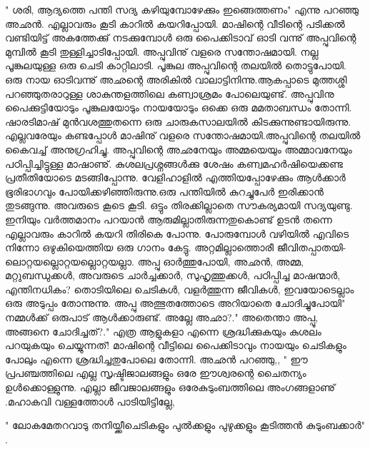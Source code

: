 " ശരി, ആദ്യത്തെ പന്തി സദ്യ കഴിയുമ്പോഴേക്കും ഇങ്ങെത്തണം" എന്നു പറഞ്ഞു അഛൻ. എല്ലാവരും കൂടി കാറിൽ കയറിപ്പോയി.
    മാഷിന്റെ വീടിന്റെ പടിക്കൽ വണ്ടിയിട്ട് അകത്തേക്കു് നടക്കുമ്പോൾ ഒരു പൈക്കിടാവ് ഓടി വന്നു് അപ്പുവിന്റെ മുമ്പിൽ  കൂടി തുള്ളിച്ചാടിപ്പോയി. അപ്പുവിനു് വളരെ സന്തോഷമായി. നല്ല പൂങ്കുലയുള്ള ഒരു ചെടി കാറ്റിലാടി. പൂങ്കുല അപ്പുവിന്റെ തലയിൽ തൊട്ടുപോയി. ഒരു നായ ഓടിവന്നു് അഛന്റെ അരികിൽ വാലാട്ടിനിന്നു.ആകപ്പാടെ മുത്തശ്ശി പറഞ്ഞുതരാറുള്ള ശാകുന്തളത്തിലെ കണ്വാശ്രമം പോലെയുണ്ട്. അപ്പുവിനു പൈക്കുട്ടിയോടും പൂങ്കുലയോടും നായയോടും ഒക്കെ ഒരു മമതാബന്ധം തോന്നി.
   ഷാരടിമാഷ് മുൻ‌വശത്തുതന്നെ ഒരു ചാരുകസാലയിൽ കിടക്കുന്നുണ്ടായിരുന്നു. എല്ലവരേയും കണ്ടപ്പോൾ മാഷിനു് വളരെ സന്തോഷമായി.അപ്പുവിന്റെ തലയിൽ കൈവച്ച് അനുഗ്രഹിച്ചു. അപ്പുവിന്റെ അഛനേയും അമ്മയെയും അമ്മാവനേയും പഠിപ്പിച്ചിട്ടുള്ള മാഷാണു്. കുശലപ്രശ്നങ്ങൾക്കു ശേഷം കണ്വമഹർഷിയെക്കണ്ട പ്രതീതിയോടെ മടങ്ങിപ്പോന്നു.
       വേളിഹാളിൽ എത്തിയപ്പോഴേക്കും ആൾക്കാർ ഭൂരിഭാഗവും പോയിക്കഴിഞ്ഞിരുന്നു.ഒരു പന്തിയിൽ കുറച്ചുപേർ ഇരിക്കാൻ തുടങ്ങുന്നു. അവരുടെ കൂടെ കൂടി. ഒട്ടും തിരക്കില്ലാതെ സൗകര്യമായി സദ്യയുണ്ടു. ഇനിയും വർത്തമാനം പറയാൻ ആരുമില്ലാതിരുന്നതുകൊണ്ട് ഉടൻ തന്നെ എല്ലാവരും കാറിൽ കയറി തിരികെ പോന്നു. പോരുമ്പോൾ വഴിയിൽ എവിടെ നിന്നോ ഒഴുകിയെത്തിയ ഒരു ഗാനം കേട്ടു.
\hspace{2em}അറ്റമില്ലാത്തൊരീ ജീവിതപ്പാതയി-
\hspace{2em}ലൊറ്റയല്ലൊറ്റയല്ലൊറ്റയല്ലാ.
അപ്പു ഓർത്തുപോയി, അഛൻ, അമ്മ, മറ്റുബന്ധുക്കൾ, അവരുടെ ചാർച്ചക്കാർ, സുഹൃത്തുക്കൾ, പഠിപ്പിച്ച മാഷന്മാർ, എന്തിനധികം? തൊടിയിലെ ചെടികൾ, വളർത്തുന്ന ജീവികൾ, ഇവയോടെല്ലാം ഒരു അടുപ്പം തോന്നുന്നു.
അപ്പു അത്ഭുതത്തോടെ അറിയാതെ ചോദിച്ചുപോയി" നമ്മൾക്ക് ഒരുപാട് ആൾക്കാരുണ്ട്. അല്ലേ അഛാ?." 
അതെന്താ അപ്പൂ, അങ്ങനെ ചോദിച്ചത്?." 
എത്ര ആളുകളാ എന്നെ ശ്രദ്ധിക്കുകയും കുശലം പറയുകയും ചെയ്യുന്നത്! മാഷിന്റെ വീട്ടിലെ പൈക്കിടാവും നായയും ചെടികളും പോലും എന്നെ ശ്രദ്ധിച്ചതുപോലെ തോന്നി.
അഛൻ പറഞ്ഞു,, " ഈ പ്രപഞ്ചത്തിലെ എല്ല സൃഷ്ടിജാലങ്ങളും ഒരേ ഈശ്വരന്റെ ചൈതന്യം ഉൾക്കൊള്ളുന്നു. എല്ലാ ജീവജാലങ്ങളും ഒരേകുടുംബത്തിലെ അംഗങ്ങളാണു് .മഹാകവി വള്ളത്തോൾ പാടിയിട്ടില്ലേ,
\begin{center}
" ലോകമേതറവാടു തനിയ്ക്കീചെടികളും പുൽക്കളും പുഴുക്കളും കൂടിത്തൻ കുടുംബക്കാർ" .
\end{center}
